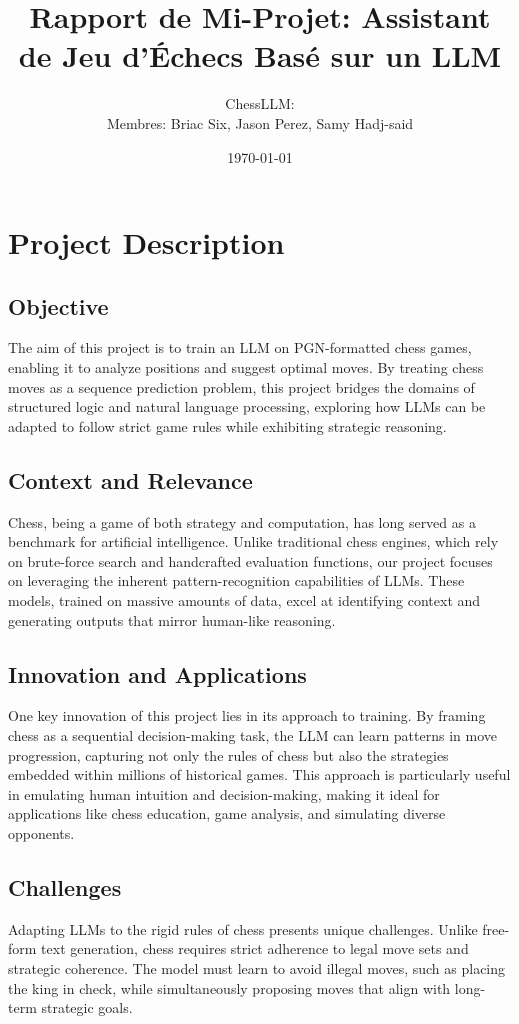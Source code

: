 \documentclass[11pt]{article}
\title{Rapport de Mi-Projet: Assistant de Jeu d'Échecs Basé sur un LLM}
\author{ChessLLM: \\ Membres: Briac Six, Jason Perez, Samy Hadj-said}
\date{\today}
\begin{document}
\maketitle

\tableofcontents %

\newpage %

\section{Project Description}
\subsection{Objective}
The aim of this project is to train an LLM on PGN-formatted chess games, enabling it to analyze positions and suggest optimal moves. By treating chess moves as a sequence prediction problem, this project bridges the domains of structured logic and natural language processing, exploring how LLMs can be adapted to follow strict game rules while exhibiting strategic reasoning.

\subsection{Context and Relevance}
Chess, being a game of both strategy and computation, has long served as a benchmark for artificial intelligence. Unlike traditional chess engines, which rely on brute-force search and handcrafted evaluation functions, our project focuses on leveraging the inherent pattern-recognition capabilities of LLMs. These models, trained on massive amounts of data, excel at identifying context and generating outputs that mirror human-like reasoning.

\subsection{Innovation and Applications}
One key innovation of this project lies in its approach to training. By framing chess as a sequential decision-making task, the LLM can learn patterns in move progression, capturing not only the rules of chess but also the strategies embedded within millions of historical games. This approach is particularly useful in emulating human intuition and decision-making, making it ideal for applications like chess education, game analysis, and simulating diverse opponents.

\subsection{Challenges}
Adapting LLMs to the rigid rules of chess presents unique challenges. Unlike free-form text generation, chess requires strict adherence to legal move sets and strategic coherence. The model must learn to avoid illegal moves, such as placing the king in check, while simultaneously proposing moves that align with long-term strategic goals.
\end{document}

